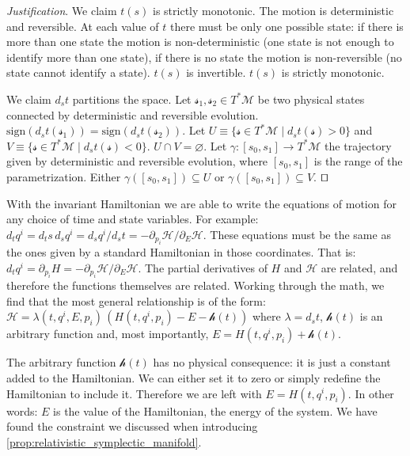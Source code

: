 \documentclass[smallextended]{svjour3}
\numberwithin{equation}{section}
\newenvironment{justification}{\emph{Justification}.}{\hfill\(\qed\)}
\begin{document}
\begin{justification}
	We claim $t(s)$ is strictly monotonic. The motion is deterministic and reversible. At each value of $t$ there must be only one possible state: if there is more than one state the motion is non-deterministic (one state is not enough to identify more than one state), if there is no state the motion is non-reversible (no state cannot identify a state). $t(s)$ is invertible. $t(s)$ is strictly monotonic.
	
	We claim $d_{s}t$ partitions the space. Let $\mathcal{s}_1, \mathcal{s}_2 \in T^*\mathcal{M}$ be two physical states connected by deterministic and reversible evolution. $\mathrm{sign}(d_{s}t(\mathcal{s}_1)) = \mathrm{sign}(d_{s}t(\mathcal{s}_2))$. Let $U \equiv \{\mathcal{s} \in T^*\mathcal{M} \; | \; d_{s}t(\mathcal{s}) > 0 \}$ and $V \equiv \{\mathcal{s} \in T^*\mathcal{M} \; | \; d_{s}t(\mathcal{s}) < 0 \}$. $U \cap V = \varnothing$. Let $\gamma : [s_0, s_1] \rightarrow T^*\mathcal{M}$ the trajectory given by deterministic and reversible evolution, where $[s_0, s_1]$ is the range of the parametrization. Either $\gamma([s_0, s_1]) \subseteq U$ or $\gamma([s_0, s_1]) \subseteq V$.
\end{justification}

With the invariant Hamiltonian we are able to write the equations of motion for any choice of time and state variables. For example: $d_t q^i = d_t s \, d_s q^i = d_s q^i / d_s t = - \partial_{p_i} \mathcal{H} / \partial_{E} \mathcal{H}$. These equations must be the same as the ones given by a standard Hamiltonian in those coordinates. That is: $d_t q^i = \partial_{p_i} H = - \partial_{p_i} \mathcal{H} / \partial_{E} \mathcal{H}$. The partial derivatives of $H$ and $\mathcal{H}$ are related, and therefore the functions themselves are related. Working through the math, we find that the most general relationship is of the form: $\mathcal{H} = \lambda(t,q^i,E,p_i) \, (H(t,q^i,p_i) - E - \mathcal{h}(t))$ where $\lambda = d_s t$, $\mathcal{h}(t)$ is an arbitrary function and, most importantly, $E = H(t,q^i,p_i) + \mathcal{h}(t)$.

The arbitrary function $\mathcal{h}(t)$ has no physical consequence: it is just a constant added to the Hamiltonian. We can either set it to zero or simply redefine the Hamiltonian to include it. Therefore we are left with $E = H(t,q^i,p_i)$. In other words: $E$ is the value of the Hamiltonian, the energy of the system. We have found the constraint we discussed when introducing \ref{prop:relativistic_symplectic_manifold}.
\end{document}
